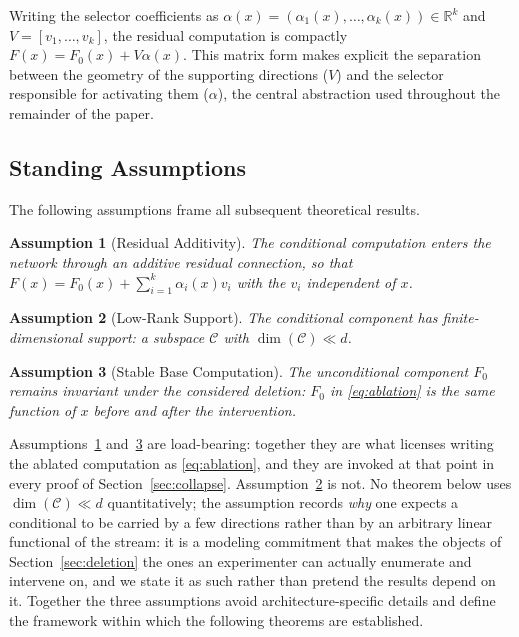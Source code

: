\documentclass[11pt,a4paper]{article}
\newtheorem{assumption}{Assumption}
\begin{document}
Writing the selector coefficients as $\alpha(x)=(\alpha_1(x),\ldots,\alpha_k(x))
\in\mathbb R^k$ and $V=[v_1,\ldots,v_k]$, the residual computation is
compactly $F(x)=F_0(x)+V\alpha(x)$. This matrix form makes explicit the
separation between the geometry of the supporting directions ($V$) and the
selector responsible for activating them ($\alpha$), the central
abstraction used throughout the remainder of the paper.

\subsection{Standing Assumptions}

The following assumptions frame all subsequent theoretical results.

\begin{assumption}[Residual Additivity]
\label{ass:additivity}
The conditional computation enters the network through an additive residual
connection, so that $F(x)=F_0(x)+\sum_{i=1}^k\alpha_i(x)v_i$ with the $v_i$
independent of $x$.
\end{assumption}

\begin{assumption}[Low-Rank Support]
\label{ass:lowrank}
The conditional component has finite-dimensional support: a
subspace $\mathcal C$ with $\dim(\mathcal C)\ll d$.
\end{assumption}

\begin{assumption}[Stable Base Computation]
\label{ass:stable}
The unconditional component $F_0$ remains invariant under the considered
deletion: $F_0$ in \eqref{eq:ablation} is the same function of $x$ before and
after the intervention.
\end{assumption}

Assumptions~\ref{ass:additivity} and~\ref{ass:stable} are load-bearing:
together they are what licenses writing the ablated computation as
\eqref{eq:ablation}, and they are invoked at that point in every proof of
Section~\ref{sec:collapse}. Assumption~\ref{ass:lowrank} is not. No theorem
below uses $\dim(\mathcal C)\ll d$ quantitatively; the assumption records
\emph{why} one expects a conditional to be carried by a few directions rather
than by an arbitrary linear functional of the stream: it is a modeling
commitment that makes the objects of Section~\ref{sec:deletion} the ones an
experimenter can actually enumerate and intervene on, and we state it as
such rather than pretend the results depend on it. Together the three
assumptions avoid architecture-specific details and define the framework
within which the following theorems are established.
\end{document}
